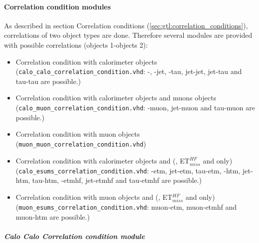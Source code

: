 \paragraph{Correlation condition modules}
\label{sec:gtl:correlation_condition_modules}

As described in section Correlation conditions (\ref{sec:gtl:correlation_conditions}), correlations of two object types are done. Therefore several modules are provided
with possible correlations (objects 1-objects 2):
\begin{itemize}
\item Correlation condition with calorimeter objects\\(\texttt{calo\_calo\_correlation\_condition.vhd}:
\egamma-\egamma, \egamma-jet, \egamma-tau, jet-jet, jet-tau and tau-tau are possible.)
\item Correlation condition with calorimeter objects and muons objects\\(\texttt{calo\_muon\_correlation\_condition.vhd}: \egamma-muon, jet-muon and tau-muon are possible.)
\item Correlation condition with muon objects\\(\texttt{muon\_muon\_correlation\_condition.vhd})
\item Correlation condition with calorimeter objects and \esums (\etm, ET$_{miss}^{HF}$ and \htm only)\\(\texttt{calo\_esums\_correlation\_condition.vhd}: \egamma-etm, jet-etm, tau-etm,
\egamma-htm, jet-htm, tau-htm, \egamma-etmhf, jet-etmhf and tau-etmhf are possible.)
\item Correlation condition with muon objects and \esums (\etm, ET$_{miss}^{HF}$ and \htm only)\\(\texttt{muon\_esums\_correlation\_condition.vhd}: muon-etm, muon-etmhf and muon-htm are possible.)
\end{itemize}

\subparagraph{Calo Calo Correlation condition module}
\label{sec:gtl:calo_calo_correlation_condition_module}

